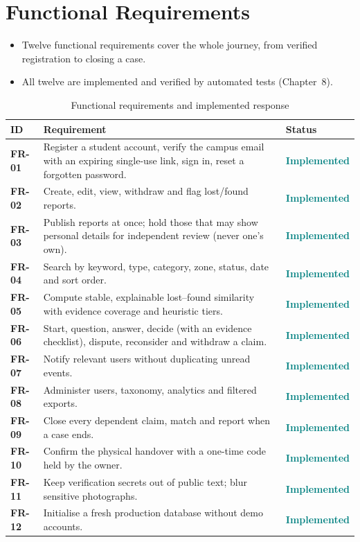 \documentclass[12pt,a4paper,oneside]{report}
\newcommand{\status}[1]{\colorbox{pale}{\textcolor{teal}{\sffamily\bfseries #1}}}
\begin{document}
\section{Functional Requirements}
\begin{itemize}
  \item Twelve functional requirements cover the whole journey, from verified registration to closing a case.
  \item All twelve are implemented and verified by automated tests (Chapter~8).
\end{itemize}
\begin{table}[H]
\centering\small
\caption{Functional requirements and implemented response}
\begin{tabularx}{\textwidth}{>{\bfseries}P{13mm}X P{27mm}}
\toprule
ID & Requirement & Status\\
\midrule
FR-01 & Register a student account, verify the campus email with an expiring single-use link, sign in, reset a forgotten password. & \status{Implemented}\\
FR-02 & Create, edit, view, withdraw and flag lost/found reports. & \status{Implemented}\\
FR-03 & Publish reports at once; hold those that may show personal details for independent review (never one's own). & \status{Implemented}\\
FR-04 & Search by keyword, type, category, zone, status, date and sort order. & \status{Implemented}\\
FR-05 & Compute stable, explainable lost--found similarity with evidence coverage and heuristic tiers. & \status{Implemented}\\
FR-06 & Start, question, answer, decide (with an evidence checklist), dispute, reconsider and withdraw a claim. & \status{Implemented}\\
FR-07 & Notify relevant users without duplicating unread events. & \status{Implemented}\\
FR-08 & Administer users, taxonomy, analytics and filtered exports. & \status{Implemented}\\
FR-09 & Close every dependent claim, match and report when a case ends. & \status{Implemented}\\
FR-10 & Confirm the physical handover with a one-time code held by the owner. & \status{Implemented}\\
FR-11 & Keep verification secrets out of public text; blur sensitive photographs. & \status{Implemented}\\
FR-12 & Initialise a fresh production database without demo accounts. & \status{Implemented}\\
\bottomrule
\end{tabularx}
\end{table}
\end{document}
